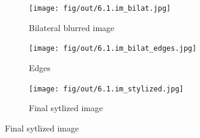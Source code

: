 \documentclass[tikz,14pt,fleqn]{article}
\begin{document}
\begin{figure}[h!]
    \centering
    \begin{subfigure}[b]{0.325\linewidth}
        \centering
        \texttt{[image: fig/out/6.1.im\_bilat.jpg]}
        \caption{Bilateral blurred image}
    \end{subfigure}
    \begin{subfigure}[b]{0.325\linewidth}
        \centering
        \texttt{[image: fig/out/6.1.im\_bilat\_edges.jpg]}
        \caption{Edges}
    \end{subfigure}
    \begin{subfigure}[b]{0.325\linewidth}
        \centering
        \texttt{[image: fig/out/6.1.im\_stylized.jpg]}
        \caption{Final sytlized image}
    \end{subfigure}
\end{figure}
\end{document}
